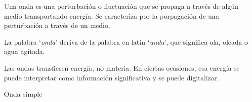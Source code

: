 Una onda es una perturbación o fluctuación que se propaga a través de algún medio transportando energía. Se caracteriza por la porpagación de una perturbación a través de un medio.

La palabra `\textit{onda}' deriva de la palabra en latín `\textit{unda}', que significa ola, oleada o agua agitada.

Las ondas transfieren energía, no materia. En ciertas ocasiones, esa energía se puede interpretar como información significativa y se puede digitalizar.

\begin{grafica}
\centering
{}
\caption{Onda simple}
\end{grafica}
